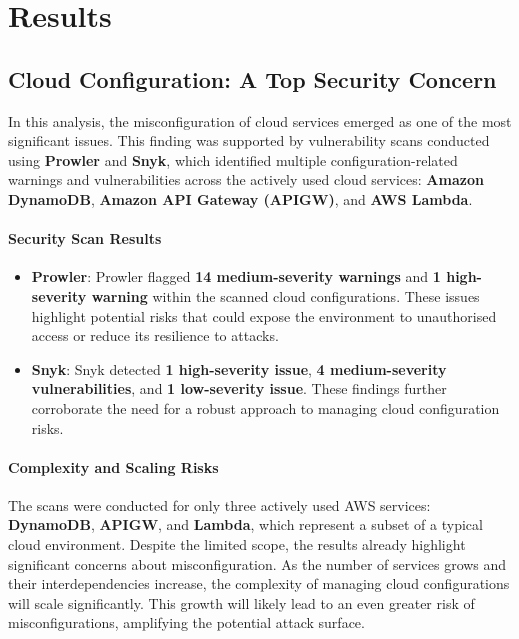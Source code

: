 \section{Results} 

\subsection{Cloud Configuration: A Top Security Concern}

In this analysis, the misconfiguration of cloud services emerged as one of the most significant issues. This finding was supported by vulnerability scans conducted using \textbf{Prowler} and \textbf{Snyk}, which identified multiple configuration-related warnings and vulnerabilities across the actively used cloud services: \textbf{Amazon DynamoDB}, \textbf{Amazon API Gateway (APIGW)}, and \textbf{AWS Lambda}.

\paragraph{Security Scan Results}
\begin{itemize}
    \item \textbf{Prowler}: Prowler flagged \textbf{14 medium-severity warnings} and \textbf{1 high-severity warning} within the scanned cloud configurations. These issues highlight potential risks that could expose the environment to unauthorised access or reduce its resilience to attacks.
    \item \textbf{Snyk}: Snyk detected \textbf{1 high-severity issue}, \textbf{4 medium-severity vulnerabilities}, and \textbf{1 low-severity issue}. These findings further corroborate the need for a robust approach to managing cloud configuration risks.
\end{itemize}

\paragraph{Complexity and Scaling Risks}
The scans were conducted for only three actively used AWS services: \textbf{DynamoDB}, \textbf{APIGW}, and \textbf{Lambda}, which represent a subset of a typical cloud environment. Despite the limited scope, the results already highlight significant concerns about misconfiguration. As the number of services grows and their interdependencies increase, the complexity of managing cloud configurations will scale significantly. This growth will likely lead to an even greater risk of misconfigurations, amplifying the potential attack surface.

